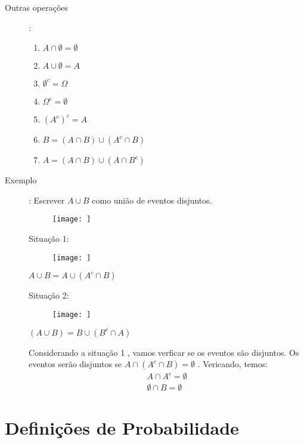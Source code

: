 \documentclass[11pt,a4paper]{book}
\begin{document}
\begin{description}
\begin{description}
  \item [Outras operações]: 

    \begin{enumerate}[leftmargin=*, label=\Roman*., widest=IV, align=left]
      \item     $A \cap \emptyset= \emptyset$ 
      \item     $A \cup \emptyset = A$ 
      \item     $\emptyset^{c} = \Omega$ 
      \item     $ \Omega^c = \emptyset$ 
      \item     $(A^c)^c = A$ 
      \item     $B= (A \cap B)\cup (A^c \cap B)$
      \item     $A= (A \cap B) \cup (A \cap B^c)$
    \end{enumerate}
      \item [Exemplo]: Escrever $A \cup B$ como união de eventos disjuntos.

        \begin{figure}[]
          \centering
          \texttt{[image: ]}
          \caption{}
          \label{figura:11}
        \end{figure}

        Situação 1:
        \begin{figure}[]
          \centering
          \texttt{[image: ]}
          \caption{}
          \label{figura:11}
        \end{figure}

        $A \cup B = A \cup (A^c \cap B)$

        Situação 2: 

        \begin{figure}[]
          \centering
          \texttt{[image: ]}
          \caption{}
          \label{figura:12}
        \end{figure}

        $(A \cup B) = B \cup (B^c \cap A)$

        Considerando a situação 1 , vamos verficar se os eventos são disjuntos. Os eventos serão disjuntos se $A \cap ( A^c \cap B )= \emptyset$ . Vericando, temos: 
        \begin{align*}
          A \cap A^c = \emptyset \\
          \emptyset \cap B= \emptyset
        \end{align*}

\end{description}
\section{Definições de Probabilidade}

\end{description}
\end{document}
